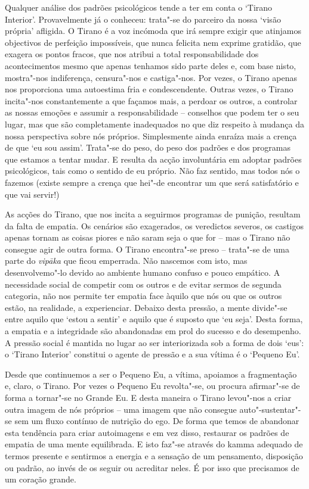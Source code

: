 Qualquer análise dos padrões psicológicos tende a ter em conta o `Tirano
Interior'. Provavelmente já o conheceu: trata"-se do parceiro da nossa `visão
própria' afligida. O Tirano é a voz incómoda que irá sempre exigir que atinjamos
objectivos de perfeição impossíveis, que nunca felicita nem exprime gratidão,
que exagera os pontos fracos, que nos atribui a total responsabilidade dos
acontecimentos mesmo que apenas tenhamos sido parte deles e, com base nisto,
mostra"-nos indiferença, censura"-nos e castiga"-nos. Por vezes, o Tirano apenas
nos proporciona uma autoestima fria e condescendente. Outras vezes, o Tirano
incita"-nos constantemente a que façamos mais, a perdoar os outros, a controlar
as nossas emoções e assumir a responsabilidade -- conselhos que podem ter o seu
lugar, mas que são completamente inadequados no que diz respeito à mudança da
nossa perspectiva sobre nós próprios. Simplesmente ainda enraíza mais a crença
de que `eu sou assim'. Trata"-se do peso, do peso dos padrões e dos programas que
estamos a tentar mudar. E resulta da acção involuntária em adoptar padrões
psicológicos, tais como o sentido de eu próprio. Não faz sentido, mas todos nós
o fazemos (existe sempre a crença que hei"-de encontrar um que será satisfatório
e que vai servir!)

As acções do Tirano, que nos incita a seguirmos programas de punição, resultam
da falta de empatia. Os cenários são exagerados, os veredictos severos, os
castigos apenas tornam as coisas piores e não saram seja o que for -- mas o
Tirano não consegue agir de outra forma. O Tirano encontra"-se preso -- trata"-se
de uma parte do \emph{vipāka} que ficou emperrada. Não nascemos com isto, mas
desenvolvemo"-lo devido ao ambiente humano confuso e pouco empático. A
necessidade social de competir com os outros e de evitar sermos de segunda
categoria, não nos permite ter empatia face àquilo que nós ou que os outros
estão, na realidade, a experienciar. Debaixo desta pressão, a mente divide"-se
entre aquilo que `estou a sentir' e aquilo que é suposto que `eu seja'. Desta
forma, a empatia e a integridade são abandonadas em prol do sucesso e do
desempenho. A pressão social é mantida no lugar ao ser interiorizada sob a forma
de dois `eus': o `Tirano Interior' constitui o agente de pressão e a sua vítima
é o `Pequeno Eu'.

Desde que continuemos a ser o Pequeno Eu, a vítima, apoiamos a fragmentação e,
claro, o Tirano. Por vezes o Pequeno Eu revolta"-se, ou procura afirmar"-se de
forma a tornar"-se no Grande Eu. E desta maneira o Tirano levou"-nos a criar outra
imagem de nós próprios -- uma imagem que não consegue auto"-sustentar"-se sem um
fluxo contínuo de nutrição do ego. De forma que temos de abandonar esta
tendência para criar autoimagens e em vez disso, restaurar os padrões de empatia
de uma mente equilibrada. E isto faz"-se através do kamma adequado de termos
presente e sentirmos a energia e a sensação de um pensamento, disposição ou
padrão, ao invés de os seguir ou acreditar neles. É por isso que precisamos de
um coração grande.

